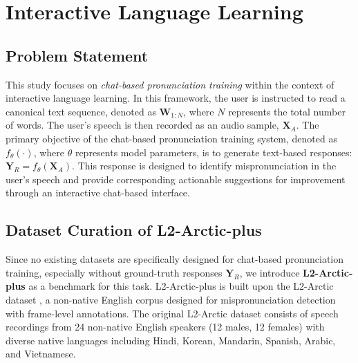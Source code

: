 \documentclass[11pt]{article}
\begin{document}
\section{Interactive Language Learning}

\subsection{Problem Statement}
This study focuses on \textit{chat-based pronunciation training} within the context of interactive language learning. In this framework, the user is instructed to read a canonical text sequence, denoted as $\boldsymbol{W}_{1:N}$, where $N$ represents the total number of words. The user's speech is then recorded as an audio sample, $\boldsymbol{X}_A$. The primary objective of the chat-based pronunciation training system, denoted as $f_{\theta}(\cdot)$, where $\theta$ represents model parameters, is to generate text-based responses: $\boldsymbol{Y}_R=f_{\theta}(\boldsymbol{X}_A)$. This response is designed to identify mispronunciation in the user's speech and provide corresponding actionable suggestions for improvement through an interactive chat-based interface. 

\subsection{Dataset Curation of L2-Arctic-plus}
\label{sec:L2-Arctic-plus}

Since no existing datasets are specifically designed for chat-based pronunciation training, especially without ground-truth responses $\boldsymbol{Y}_R$, we introduce \textbf{L2-Arctic-plus} as a benchmark for this task. L2-Arctic-plus is built upon the L2-Arctic dataset \cite{l2-arctic}, a non-native English corpus designed for mispronunciation detection with frame-level annotations. The original L2-Arctic dataset consists of speech recordings from 24 non-native English speakers (12 males, 12 females) with diverse native languages including Hindi, Korean, Mandarin, Spanish, Arabic, and Vietnamese.
\end{document}
